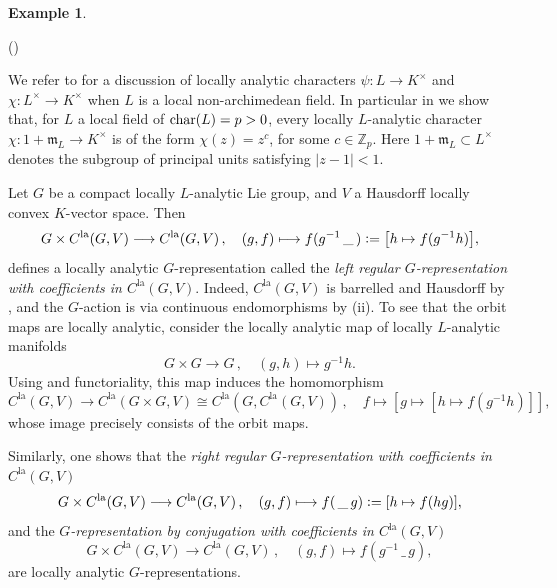 \documentclass[a4paper, reqno, 10pt]{amsart}
\theoremstyle{definition}
\newtheorem{example}[theorem]{Example}
\newenvironment{altenumerate}
	{\begin{list}
		{\textup{(\theenumi)} }
		{\usecounter{enumi}
			\setlength{\labelwidth}{0pt}
			\setlength{\labelsep}{0pt}
			\setlength{\leftmargin}{0pt}
			\setlength{\itemsep}{0pt}
			\setlength{\topsep}{0pt}
		\renewcommand{\theenumi}{\roman{enumi}}
		}}
	{\end{list}}
\numberwithin{equation}{section}
\newcommand{\abs}[1]{{\lvert{#1}\rvert}}
\newcommand{\blank}{{\,\_\,}}
\newcommand{\defeq}{\vcentcolon=}
\newcommand{\la}{{\mathrm{la}}}
\newcommand{\lra}{\longrightarrow}
\newcommand{\lto}{\longmapsto}
\newcommand{\mto}{\mapsto}
\newcommand{\ra}{\rightarrow}
\newcommand{\unts}{^{\times}}
\newcommand{\BZ}{{\mathbb {Z}}}
\newcommand{\Fm}{{\mathfrak {m}}}
\begin{document}
\begin{example}\label{Expl 1 - Examples of locally analytic representations}
	\begin{altenumerate}
		\item
		We refer to  for a discussion of locally analytic characters $\psi\colon L \ra K\unts$ and $\chi \colon L\unts \ra K\unts$ when $L$ is a local non-archimedean field.
		In particular in  we show that, for $L$ a local field of ${\rm char}(L)=p>0$, every locally $L$-analytic character $\chi\colon 1+\Fm_L \ra K\unts$ is of the form $\chi(z)= z^c$, for some $c\in \BZ_p$.
		Here $1+\Fm_L \subset L\unts$ denotes the subgroup of principal units satisfying $\abs{z-1}< 1$.
		\item
		Let $G$ be a compact locally $L$-analytic Lie group, and $V$ a Hausdorff locally convex $K$-vector space.
		Then
		\begin{equation*}
			G \times C^\la(G,V) \lra C^\la(G,V) \,,\quad (g,f) \lto f(g^{-1}  \blank) \defeq \big[h \mto f(g^{-1}h) \big],
		\end{equation*}
		defines a locally analytic $G$-representation called the \textit{left regular $G$-representation with coefficients in $C^\la(G,V)$}.
		Indeed, $C^\la(G,V)$ is barrelled and Hausdorff by , and the $G$-action is via continuous endomorphisms by  (ii).
		To see that the orbit maps are locally analytic, consider the locally analytic map of locally $L$-analytic manifolds
		\begin{equation*}
			G \times G \lra G \,,\quad (g,h) \lto g^{-1} h.
		\end{equation*}
		Using  and functoriality, this map induces the homomorphism
		\begin{equation*}
			C^\la(G,V) \lra C^\la(G\times G, V) \cong C^\la( G, C^\la(G,V)) \,,\quad f \lto [g \mto [h \mto f(g^{-1}h)]],
		\end{equation*}
		whose image precisely consists of the orbit maps.
		
		
		Similarly, one shows that the \textit{right regular $G$-representation with coefficients in $C^\la(G,V)$}
		\begin{equation*}
			G \times C^\la(G,V) \lra C^\la(G,V) \,,\quad (g,f) \lto f(\blank g) \defeq [h \mto f(hg)],
		\end{equation*}
		and the \textit{$G$-representation by conjugation with coefficients in $C^\la(G,V)$}
		\begin{equation*}
			G \times C^\la(G,V) \lra C^\la(G,V) \,,\quad (g,f) \lto f(g^{-1} \blank g),
		\end{equation*}
		are locally analytic $G$-representations.
	\end{altenumerate}
\end{example}
\end{document}
